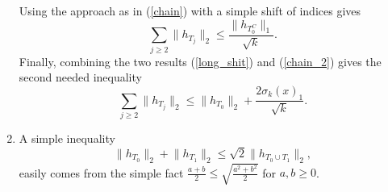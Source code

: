 \documentclass[11pt,oneside,czech,american]{book} %
\theoremstyle{plain}
\theoremstyle{definition}
\begin{document}
\begin{enumerate}
Using the approach as in (\ref{chain}) with a simple shift of indices gives
\begin{equation}
	\sum_{j\geq 2} \lVert h_{T_j} \rVert_2 \leq \frac{\lVert h_{T^C_0} \rVert_1}{\sqrt{k}}.
	\label{chain_2}
\end{equation}
Finally, combining the two results (\ref{long_shit}) and (\ref{chain_2}) gives the second needed inequality
\begin{equation}
	\sum_{j\geq 2} \lVert h_{T_j} \rVert_2 \leq \lVert h_{T_0} \rVert_2 + \frac{ 2\sigma_k(x)_1}{\sqrt{k}}.
	\label{second_needed}
\end{equation}
\item A simple inequality
\begin{equation}
	\lVert h_{T_0} \rVert_2 + \lVert h_{T_1} \rVert_2 \leq \sqrt{2} \lVert h_{T_0 \cup T_1} \rVert_2,
	\label{simple_shit}
\end{equation}
easily comes from the simple fact $\frac{a+b}{2} \leq \sqrt{\frac{a^2 + b^2}{2}}$ for $a,b \geq 0$.
\end{enumerate}
\end{document}

